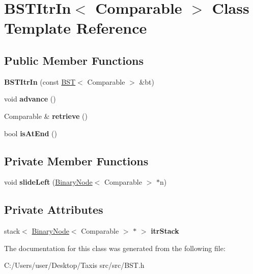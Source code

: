 \hypertarget{class_b_s_t_itr_in}{}\section{B\+S\+T\+Itr\+In$<$ Comparable $>$ Class Template Reference}
\label{class_b_s_t_itr_in}
\subsection*{Public Member Functions}
\begin{DoxyCompactItemize}
\item 
\mbox{\label{class_b_s_t_itr_in_ac836e2f560fed9cc7ef8e5431a2836cc}} 
{\bfseries B\+S\+T\+Itr\+In} (const \hyperlink{class_b_s_t}{B\+ST}$<$ Comparable $>$ \&bt)
\item 
\mbox{\label{class_b_s_t_itr_in_ac772d3ebbac748c5f8cf9bc659f2e32c}} 
void {\bfseries advance} ()
\item 
\mbox{\label{class_b_s_t_itr_in_ac7ac215c1247bd25fc1fdb8053826a32}} 
Comparable \& {\bfseries retrieve} ()
\item 
\mbox{\label{class_b_s_t_itr_in_a6f9a43217862c263a9bf15b9a08b889a}} 
bool {\bfseries is\+At\+End} ()
\end{DoxyCompactItemize}
\subsection*{Private Member Functions}
\begin{DoxyCompactItemize}
\item 
\mbox{\label{class_b_s_t_itr_in_a896191c02da37364153df2363ff28e7e}} 
void {\bfseries slide\+Left} (\hyperlink{class_binary_node}{Binary\+Node}$<$ Comparable $>$ $\ast$n)
\end{DoxyCompactItemize}
\subsection*{Private Attributes}
\begin{DoxyCompactItemize}
\item 
\mbox{\label{class_b_s_t_itr_in_ad7cb5e89f04cf08f5615aa53614dd916}} 
stack$<$ \hyperlink{class_binary_node}{Binary\+Node}$<$ Comparable $>$ $\ast$ $>$ {\bfseries itr\+Stack}
\end{DoxyCompactItemize}


The documentation for this class was generated from the following file\+:\begin{DoxyCompactItemize}
\item 
C\+:/\+Users/user/\+Desktop/\+Taxis src/src/B\+S\+T.\+h\end{DoxyCompactItemize}
